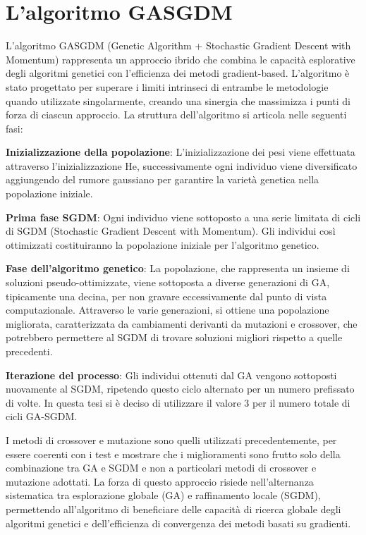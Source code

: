 \section{L'algoritmo GASGDM}
L'algoritmo GASGDM (Genetic Algorithm + Stochastic Gradient Descent with Momentum) rappresenta un approccio ibrido  che combina  le capacità esplorative degli algoritmi genetici con l'efficienza dei metodi gradient-based. L'algoritmo è stato progettato per superare i limiti intrinseci di entrambe le metodologie quando utilizzate singolarmente, creando una sinergia che massimizza i punti di forza di ciascun approccio.
La struttura dell'algoritmo si articola nelle seguenti fasi:

\begin{compactitemize}
\item \textbf{Inizializzazione della popolazione}: L'inizializzazione dei pesi viene effettuata attraverso l'inizializzazione He, successivamente ogni individuo viene diversificato aggiungendo del rumore gaussiano per garantire la varietà genetica nella popolazione iniziale.
\item \textbf{Prima fase SGDM}: Ogni individuo viene sottoposto a una serie limitata di cicli di SGDM (Stochastic Gradient Descent with Momentum). Gli individui così ottimizzati costituiranno la popolazione iniziale per l'algoritmo genetico. 
\item \textbf{Fase dell'algoritmo genetico}: La popolazione, che rappresenta un insieme di soluzioni pseudo-ottimizzate, viene sottoposta a diverse generazioni di GA, tipicamente una decina, per non gravare eccessivamente dal punto di vista computazionale. Attraverso le varie generazioni, si ottiene una popolazione migliorata, caratterizzata da cambiamenti derivanti da mutazioni e crossover, che potrebbero permettere al SGDM di trovare soluzioni migliori rispetto a quelle precedenti.
\item \textbf{Iterazione del processo}: Gli individui ottenuti dal GA vengono sottoposti nuovamente al SGDM, ripetendo questo ciclo alternato per un numero prefissato di volte. In questa tesi si è deciso di utilizzare il valore 3 per il numero totale di cicli GA-SGDM.
\end{compactitemize}
I metodi di crossover e mutazione sono quelli utilizzati precedentemente, per essere coerenti con i test e mostrare che i miglioramenti sono frutto solo della combinazione tra GA e SGDM e non a particolari metodi di crossover e mutazione adottati.
La forza di questo approccio risiede nell'alternanza sistematica tra esplorazione globale (GA) e raffinamento locale (SGDM), permettendo all'algoritmo di beneficiare delle capacità di ricerca globale degli algoritmi genetici e dell'efficienza di convergenza dei metodi basati su gradienti.



